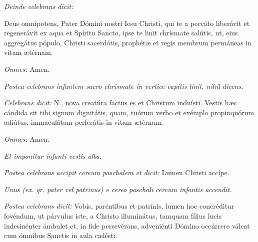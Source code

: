 \textit{Deinde celebrans dicit:}

Deus omnípotens, Pater Dómini nostri Iesu Christi, qui te a peccáto liberávit et regenerávit ex aqua et
Spíritu Sancto, ipse te linit chrísmate salútis, ut, eius aggregátus pópulo, Christi sacerdótis,
prophétæ et regis membrum permáneas in vitam ætérnam.

\textit{Omnes:} Amen.

\textit{Postea celebrans infantem sacro chrismate in vertice capitis linit, nihil dicens.}


\textit{Celebrans dicit:} {\color{red}N.}, nova creatúra factus es et Christum induísti.
Vestis hæc cándida sit tibi signum dignitátis, quam, tuórum verbo et exémplo propinquórum adiútus,
immaculátam perferátis in vitam ætérnam.

\textit{Omnes:} Amen.

\textit{Et imponitur infanti vestis alba.}


\textit{Postea celebrans accipit cereum paschalem et dicit:} Lumen Christi accípe.

\textit{Unus (ex. gr. pater vel patrinus) e cereo paschali cereum infantis accendit.}

\textit{Postea celebrans dicit:} Vobis, paréntibus et patrínis, lumen hoc concréditur fovéndum,
ut párvulus iste, a Christo illuminátus, tamquam fílius lucis indesinénter ámbulet et,
in fide persevérans, adveniénti Dómino occúrrere váleat cum ómnibus Sanctis in aula
cælésti.

